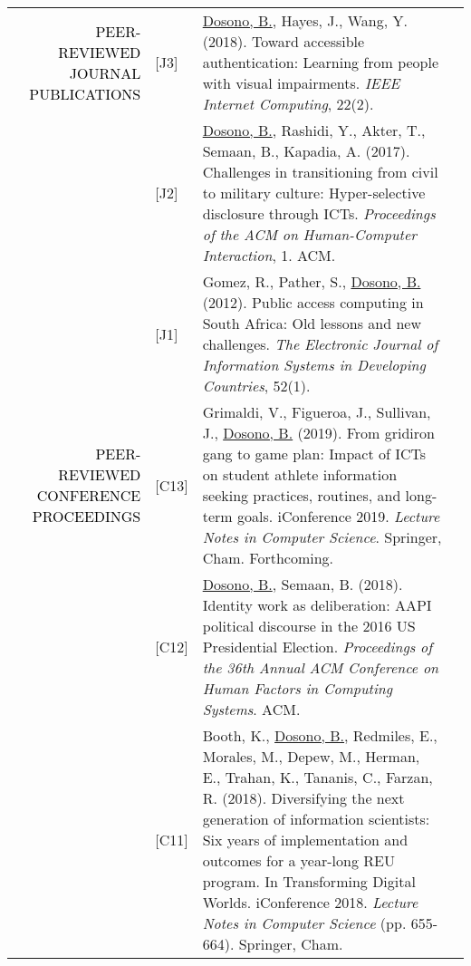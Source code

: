 \documentclass[12pt]{article}
\begin{document}
{{\begin{longtable}{Rp{1.0in}p{0.25in}p{4.75in}}
\textcolor{black}{\footnotesize{\uppercase{Peer-reviewed Journal Publications}}} & \footnotesize{[J3]} & \href{https://doi.org/10.1109/MIC.2018.112101619}{{Dosono, B.}}, Hayes, J., Wang, Y. (2018). Toward accessible authentication: Learning from people with visual impairments. \textit{IEEE Internet Computing}, 22(2). \\

& \footnotesize{[J2]} & \href{https://dl.acm.org/authorize?N42807}{{Dosono, B.}}, Rashidi, Y., Akter, T., Semaan, B., Kapadia, A. (2017). Challenges in transitioning from civil to military culture: Hyper-selective disclosure through ICTs. \textit{Proceedings of the ACM on Human-Computer Interaction}, 1. ACM. \\

& \footnotesize{[J1]} & Gomez, R., Pather, S., \href{https://doi.org/10.1002/j.1681-4835.2012.tb00366.x}{{Dosono, B.}} (2012). Public access computing in South Africa: Old lessons and new challenges. \textit{The Electronic Journal of Information Systems in Developing Countries}, 52(1). \\

\textcolor{black}{\footnotesize{\uppercase{Peer-reviewed Conference Proceedings}}} & 
\footnotesize{[C13]} & Grimaldi, V., Figueroa, J., Sullivan, J., \href{https://link.springer.com/conference/iconference}{{Dosono, B.}} (2019). From gridiron gang to game plan: Impact of ICTs on student athlete information seeking practices, routines, and long-term goals. iConference 2019. \textit{Lecture Notes in Computer Science}. Springer, Cham. Forthcoming. \\

& \footnotesize{[C12]} & \href{https://dl.acm.org/authorize?N658208}{{Dosono, B.}}, Semaan, B. (2018). Identity work as deliberation: AAPI political discourse in the 2016 US Presidential Election. \textit{Proceedings of the 36th Annual ACM Conference on Human Factors in Computing Systems}. ACM. \\

& \footnotesize{[C11]} & Booth, K., \href{https://doi.org/10.1007/978-3-319-78105-1_75}{ {Dosono, B.}}, Redmiles, E., Morales, M., Depew, M., Herman, E., Trahan, K., Tananis, C., Farzan, R. (2018). Diversifying the next generation of information scientists: Six years of implementation and outcomes for a year-long REU program. In Transforming Digital Worlds. iConference 2018. \textit{Lecture Notes in Computer Science} (pp. 655-664). Springer, Cham. \\


\end{longtable}}}
\end{document}
